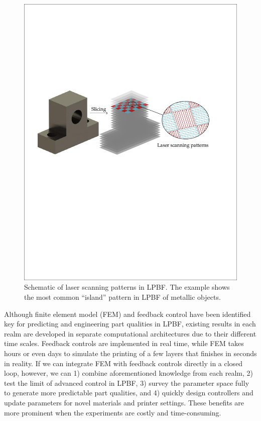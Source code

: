 \documentclass [11pt, proquest] {uwthesis}[2020/02/24]
\begin{document}
\begin{figure}[!ht]
\begin{centering}
\includegraphics[width=13cm]{Fractional-order-RC/laser scanning patterns_dw}
\par\end{centering}
\caption{\label{fig:Schematic-of-laser-scanning}Schematic of laser scanning patterns
in LPBF. The example shows the most common ``island'' pattern in
LPBF of metallic objects.}
\end{figure}

Although finite element model (FEM) and feedback control have been
identified key for predicting and engineering part qualities in LPBF,
existing results in each realm are developed in separate computational
architectures due to their different time scales. Feedback controls
are implemented in real time, while FEM takes hours or even days to
simulate the printing of a few layers that finishes in seconds in
reality. If we can integrate FEM with feedback controls directly in
a closed loop, however, we can 1) combine aforementioned knowledge
from each realm, 2) test the limit of advanced control in LPBF, 3)
survey the parameter space fully to generate more predictable part
qualities, and 4) quickly design controllers and update parameters
for novel materials and printer settings. These benefits are more
prominent when the experiments are costly and time-consuming.
\end{document}
